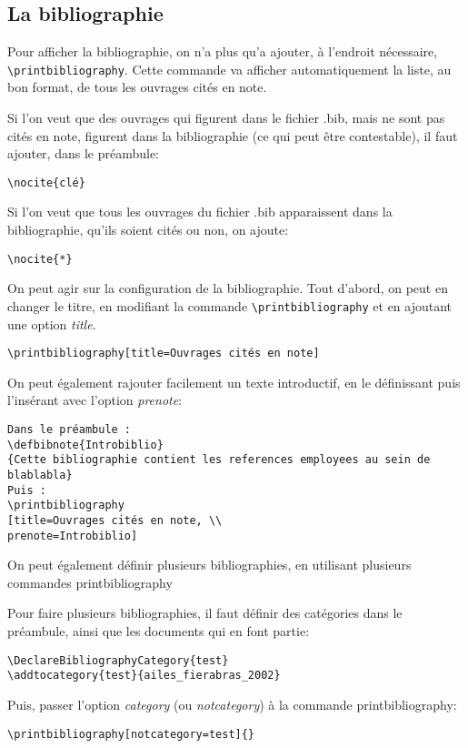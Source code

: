 \documentclass[a4paper,twoside,french,12pt]{book}
\begin{document}
\subsection{La bibliographie}

Pour afficher la bibliographie, on n'a plus qu'a ajouter, à l'endroit nécessaire, \verb=\printbibliography=.
Cette commande va afficher automatiquement la liste, au bon format, de tous les ouvrages cités en note.

Si l'on veut que des ouvrages qui figurent dans le fichier .bib, mais ne sont pas cités en note, figurent dans la bibliographie (ce qui peut être contestable), il faut ajouter, dans le préambule:
\begin{verbatim}
\nocite{clé}
\end{verbatim}
Si l'on veut que tous les ouvrages du fichier .bib apparaissent dans la bibliographie, qu'ils soient cités ou non, on ajoute:
\begin{verbatim}
\nocite{*}
\end{verbatim}

On peut agir sur la configuration de la bibliographie. Tout d'abord, on peut en changer le titre, en modifiant la commande \verb=\printbibliography= et en ajoutant une option \textit{title}.
\begin{verbatim}
\printbibliography[title=Ouvrages cités en note]
\end{verbatim}
On peut également rajouter facilement un texte introductif, en le définissant puis l'insérant avec l'option \textit{prenote}:
\begin{verbatim}
Dans le préambule :
\defbibnote{Introbiblio}
{Cette bibliographie contient les references employees au sein de blablabla}
Puis :
\printbibliography
[title=Ouvrages cités en note, \\
prenote=Introbiblio]
\end{verbatim}

On peut également définir plusieurs bibliographies, en utilisant plusieurs commandes printbibliography%

Pour faire plusieurs bibliographies, il faut définir des catégories dans le préambule, ainsi que les documents qui en font partie:
\begin{verbatim}
\DeclareBibliographyCategory{test}
\addtocategory{test}{ailes_fierabras_2002}
\end{verbatim}
Puis, passer l'option \textit{category} (ou \textit{notcategory}) à la commande printbibliography:
\begin{verbatim}
\printbibliography[notcategory=test]{}
\end{verbatim}
\end{document}
